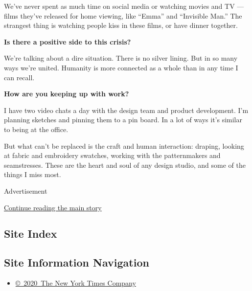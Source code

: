 We've never spent as much time on social media or watching movies and TV
--- films they've released for home viewing, like ``Emma'' and
``Invisible Man.'' The strangest thing is watching people kiss in these
films, or have dinner together.

\textbf{Is there a positive side to this crisis?}

We're talking about a dire situation. There is no silver lining. But in
so many ways we're united. Humanity is more connected as a whole than in
any time I can recall.

\textbf{How are you keeping up with work?}

I have two video chats a day with the design team and product
development. I'm planning sketches and pinning them to a pin board. In a
lot of ways it's similar to being at the office.

But what can't be replaced is the craft and human interaction: draping,
looking at fabric and embroidery swatches, working with the
patternmakers and seamstresses. These are the heart and soul of any
design studio, and some of the things I miss most.

Advertisement

\protect\hyperlink{after-bottom}{Continue reading the main story}

\hypertarget{site-index}{%
\subsection{Site Index}\label{site-index}}

\hypertarget{site-information-navigation}{%
\subsection{Site Information
Navigation}\label{site-information-navigation}}

\begin{itemize}
\tightlist
\item
  \href{https://help.nytimes3xbfgragh.onion/hc/en-us/articles/115014792127-Copyright-notice}{©~2020~The
  New York Times Company}
\end{itemize}

